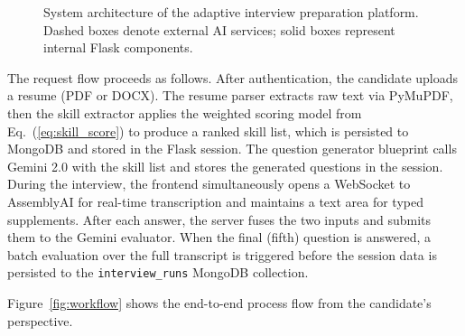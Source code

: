\documentclass[conference]{IEEEtran}
\begin{document}
\begin{figure}[htbp]
\caption{System architecture of the adaptive interview preparation platform. Dashed boxes denote external AI services; solid boxes represent internal Flask components.}
\label{fig:architecture}
\end{figure}

The request flow proceeds as follows. After authentication, the candidate uploads a resume (PDF or DOCX). The resume parser extracts raw text via PyMuPDF, then the skill extractor applies the weighted scoring model from Eq.~(\ref{eq:skill_score}) to produce a ranked skill list, which is persisted to MongoDB and stored in the Flask session. The question generator blueprint calls Gemini 2.0 with the skill list and stores the generated questions in the session. During the interview, the frontend simultaneously opens a WebSocket to AssemblyAI for real-time transcription and maintains a text area for typed supplements. After each answer, the server fuses the two inputs and submits them to the Gemini evaluator. When the final (fifth) question is answered, a batch evaluation over the full transcript is triggered before the session data is persisted to the \texttt{interview\_runs} MongoDB collection.

Figure~\ref{fig:workflow} shows the end-to-end process flow from the candidate's perspective.
\end{document}
